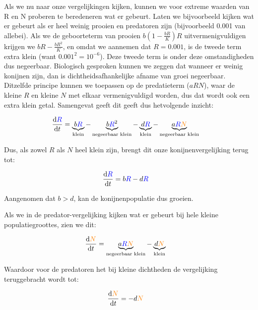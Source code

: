 \documentclass[
  a4paper,
]{scrbook}
\theoremstyle{definition}
\theoremstyle{remark}
\begin{document}
Als we nu naar onze vergelijkingen kijken, kunnen we voor extreme
waarden van R en N proberen te beredeneren wat er gebeurt. Laten we
bijvoorbeeld kijken wat er gebeurt als er heel weinig prooien en
predatoren zijn (bijvoorbeeld 0.001 van allebei). Als we de geboorteterm
van prooien \(b(1- \frac{bR}{K})R\) uitvermenigvuldigen krijgen we
\(bR - \frac{bR^2}{K}\), en omdat we aannemen dat \(R=0.001\), is de
tweede term extra klein (want \(0.001^2 = 10^{-6}\)). Deze tweede term
is onder deze omstandigheden dus negeerbaar. Biologisch gesproken kunnen
we zeggen dat wanneer er weinig konijnen zijn, dan is
dichtheidsafhankelijke afname van groei negeerbaar. Ditzelfde principe
kunnen we toepassen op de predatieterm (\(aRN\)), waar de kleine \(R\)
en kleine \(N\) met elkaar vermenigvuldigd worden, dus dat wordt ook een
extra klein getal. Samengevat geeft dit geeft dus hetvolgende inzicht:

\begin{align*}
  \frac{\mathrm{d}\color{blue}R}{\mathrm{d}t} &=\underbrace{b\color{blue}R}_{\text{klein}} -
    \underbrace{b\color{blue}R\color{black}^2}_{\text{negeerbaar klein}} -
   \underbrace{d\color{blue}R}_{\text{klein}} - \underbrace{\color{black}a\color{blue}R\color{orange}N\color{black}}_{\text{negeerbaar klein}}
\end{align*}

Dus, als zowel \(R\) als \(N\) heel klein zijn, brengt dit onze
konijnenvergelijking terug tot:

\begin{align*}
   \frac{\mathrm{d}\color{blue}R}{\mathrm{d}t} &= b\color{blue}R\color{black} -
   d\color{blue}R
\end{align*}

Aangenomen dat \(b>d\), kan de konijnenpopulatie dus groeien.

Als we in de predator-vergelijking kijken wat er gebeurt bij hele kleine
populatiegroottes, zien we dit:

\begin{align*}
\frac{\mathrm{d}\color{orange}N}{\mathrm{d}t} &=
    \underbrace{a\color{blue}R\color{orange}N\color{black}}_{\text{negeerbaar klein}} -
    \underbrace{d\color{orange}N\color{black}}_{\text{klein}}
\end{align*}

Waardoor voor de predatoren het bij kleine dichtheden de vergelijking
teruggebracht wordt tot:

\begin{align*}
\frac{\mathrm{d}\color{orange}N\color{black}}{\mathrm{d}t} &= -d\color{orange}N
\end{align*}
\end{document}
